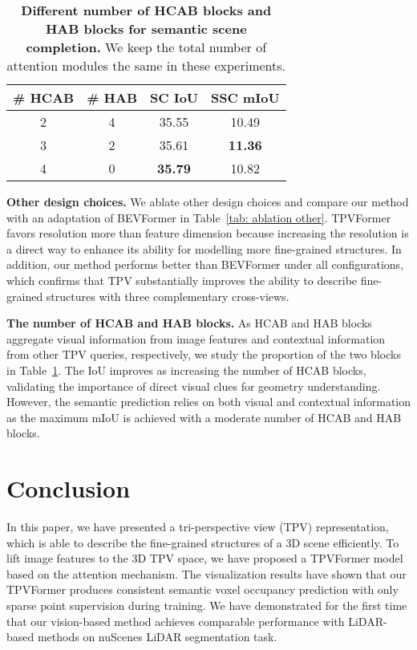 \documentclass[10pt,twocolumn,letterpaper]{article}
\begin{document}
\begin{table}[t] \small
    \caption{\textbf{Different number of HCAB blocks and HAB blocks for semantic scene completion.} We keep the total number of attention modules the same in these experiments.}
	\vspace{-3mm}
    \centering
    \begin{tabular}{cc|cc}
			\toprule
			\# HCAB  & \# HAB & SC IoU & SSC mIoU  
			\\
			\midrule
			2 & 4 & 35.55 & 10.49
			\\
			3 & 2 & 35.61 & \textbf{11.36}
			\\
			4 & 0 & \textbf{35.79} & 10.82
			\\
			\bottomrule
		\end{tabular}
    \label{tab: ablation blocks}
    \vspace{-7mm}
\end{table}

\textbf{Other design choices.}
We ablate other design choices and compare our method with an adaptation of BEVFormer in Table~\ref{tab: ablation other}.
TPVFormer favors resolution more than feature dimension because increasing the resolution is a direct way to enhance its ability for modelling more fine-grained structures.
In addition, our method performs better than BEVFormer under all configurations, which confirms that TPV substantially improves the ability to describe fine-grained structures with three complementary cross-views. 


\textbf{The number of HCAB and HAB blocks.}
As HCAB and HAB blocks aggregate visual information from image features and contextual information from other TPV queries, respectively, we study the proportion of the two blocks in Table~\ref{tab: ablation blocks}.
The IoU improves as increasing the number of HCAB blocks, validating the importance of direct visual clues for geometry understanding.
However, the semantic prediction relies on both visual and contextual information as the maximum mIoU is achieved with a moderate number of HCAB and HAB blocks.



 \section{Conclusion}
In this paper, we have presented a tri-perspective view (TPV) representation, which is able to describe the fine-grained structures of a 3D scene efficiently.
To lift image features to the 3D TPV space, we have proposed a TPVFormer model based on the attention mechanism.
The visualization results have shown that our TPVFormer produces consistent semantic voxel occupancy prediction with only sparse point supervision during training.
We have demonstrated for the first time that our vision-based method achieves comparable performance with LiDAR-based methods on nuScenes LiDAR segmentation task.
 
\end{document}
